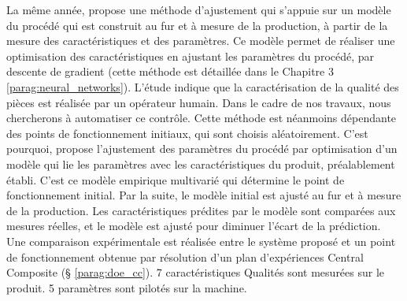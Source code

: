 La même année, \cite{ivester_automatic_1998} propose une méthode d'ajustement qui s'appuie sur un modèle du procédé qui est construit au fur et à mesure de la production, à partir de la mesure des caractéristiques et des paramètres.
Ce modèle permet de réaliser une optimisation des caractéristiques en ajustant les paramètres du procédé, par descente de gradient (cette méthode est détaillée dans le Chapitre 3 \ref{parag:neural_networks}). 
L'étude indique que la caractérisation de la qualité des pièces est réalisée par un opérateur humain.
Dans le cadre de nos travaux, nous chercherons à automatiser ce contrôle.
Cette méthode est néanmoins dépendante des points de fonctionnement initiaux, qui sont choisis aléatoirement.
C’est pourquoi, \cite{yang_knowledgebased_2000} propose l'ajustement des paramètres du procédé par optimisation d'un modèle qui lie les paramètres avec les caractéristiques du produit, préalablement établi.
C’est ce modèle empirique multivarié qui détermine le point de fonctionnement initial.
Par la suite, le modèle initial est ajusté au fur et à mesure de la production.
Les caractéristiques prédites par le modèle sont comparées aux mesures réelles, et le modèle est ajusté pour diminuer l'écart de la prédiction.
Une comparaison expérimentale est réalisée entre le système proposé et un point de fonctionnement obtenue par résolution d'un plan d'expériences Central Composite (§ \ref{parag:doe_cc}).
7 caractéristiques Qualités sont mesurées sur le produit.
5 paramètres sont pilotés sur la machine. %
